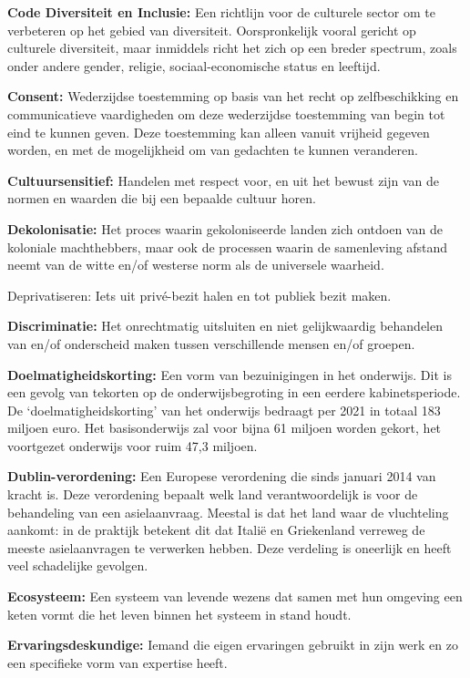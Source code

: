\textbf{Code Diversiteit en Inclusie:} Een richtlijn voor de culturele
sector om te verbeteren op het gebied van diversiteit. Oorspronkelijk
vooral gericht op culturele diversiteit, maar inmiddels richt het zich
op een breder spectrum, zoals onder andere gender, religie,
sociaal-economische status en leeftijd.

\textbf{Consent:} Wederzijdse toestemming op basis van het recht op
zelfbeschikking en communicatieve vaardigheden om deze wederzijdse
toestemming van begin tot eind te kunnen geven. Deze toestemming kan
alleen vanuit vrijheid gegeven worden, en met de mogelijkheid om van
gedachten te kunnen veranderen.

\textbf{Cultuursensitief:} Handelen met respect voor, en uit het bewust
zijn van de normen en waarden die bij een bepaalde cultuur horen.

\textbf{Dekolonisatie:} Het proces waarin gekoloniseerde landen zich
ontdoen van de koloniale machthebbers, maar ook de processen waarin de
samenleving afstand neemt van de witte en/of westerse norm als de
universele waarheid.

Deprivatiseren: Iets uit privé-bezit halen en tot publiek bezit maken.

\textbf{Discriminatie:} Het onrechtmatig uitsluiten en niet
gelijkwaardig behandelen van en/of onderscheid maken tussen
verschillende mensen en/of groepen.

\textbf{Doelmatigheidskorting:} Een vorm van bezuinigingen in het
onderwijs. Dit is een gevolg van tekorten op de onderwijsbegroting in
een eerdere kabinetsperiode. De `doelmatigheidskorting' van het
onderwijs bedraagt per 2021 in totaal 183 miljoen euro. Het
basisonderwijs zal voor bijna 61 miljoen worden gekort, het voortgezet
onderwijs voor ruim 47,3 miljoen.

\textbf{Dublin-verordening:} Een Europese verordening die sinds januari
2014 van kracht is. Deze verordening bepaalt welk land verantwoordelijk
is voor de behandeling van een asielaanvraag. Meestal is dat het land
waar de vluchteling aankomt: in de praktijk betekent dit dat Italië en
Griekenland verreweg de meeste asielaanvragen te verwerken hebben. Deze
verdeling is oneerlijk en heeft veel schadelijke gevolgen.

\textbf{Ecosysteem:} Een systeem van levende wezens dat samen met hun
omgeving een keten vormt die het leven binnen het systeem in stand
houdt.

\textbf{Ervaringsdeskundige:} Iemand die eigen ervaringen gebruikt in
zijn werk en zo een specifieke vorm van expertise heeft.

